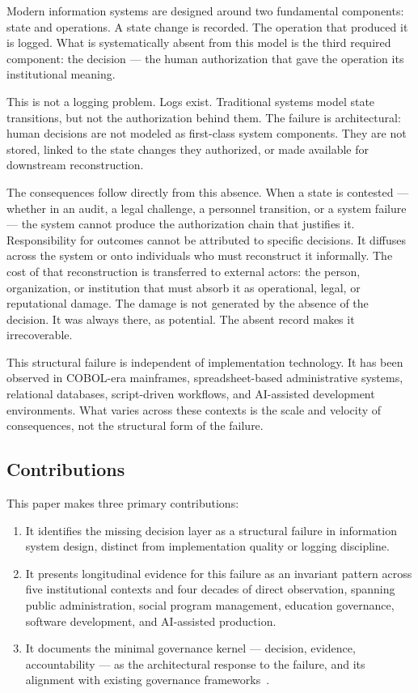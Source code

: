 \documentclass[conference]{IEEEtran}
\begin{document}
Modern information systems are designed around two fundamental components: state and operations. A state change is recorded. The operation that produced it is logged. What is systematically absent from this model is the third required component: the decision --- the human authorization that gave the operation its institutional meaning.

This is not a logging problem. Logs exist. Traditional systems model state transitions, but not the authorization behind them. The failure is architectural: human decisions are not modeled as first-class system components. They are not stored, linked to the state changes they authorized, or made available for downstream reconstruction.

The consequences follow directly from this absence. When a state is contested --- whether in an audit, a legal challenge, a personnel transition, or a system failure --- the system cannot produce the authorization chain that justifies it. Responsibility for outcomes cannot be attributed to specific decisions. It diffuses across the system or onto individuals who must reconstruct it informally. The cost of that reconstruction is transferred to external actors: the person, organization, or institution that must absorb it as operational, legal, or reputational damage. The damage is not generated by the absence of the decision. It was always there, as potential. The absent record makes it irrecoverable.

This structural failure is independent of implementation technology. It has been observed in COBOL-era mainframes, spreadsheet-based administrative systems, relational databases, script-driven workflows, and AI-assisted development environments. What varies across these contexts is the scale and velocity of consequences, not the structural form of the failure.

\subsection{Contributions}

This paper makes three primary contributions:

\begin{enumerate}
  \item It identifies the missing decision layer as a structural failure in information system design, distinct from implementation quality or logging discipline.
  \item It presents longitudinal evidence for this failure as an invariant pattern across five institutional contexts and four decades of direct observation, spanning public administration, social program management, education governance, software development, and AI-assisted production.
  \item It documents the minimal governance kernel --- decision, evidence, accountability --- as the architectural response to the failure, and its alignment with existing governance frameworks~\cite{nist2023,w3c_prov,iso42001}.
\end{enumerate}
\end{document}
